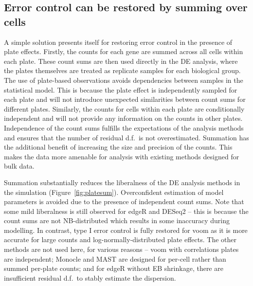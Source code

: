 \documentclass[oupdraft]{bio}
\begin{document}
\subsection{Error control can be restored by summing over cells}
A simple solution presents itself for restoring error control in the presence of plate effects.
Firstly, the counts for each gene are summed across all cells within each plate.
These count sums are then used directly in the DE analysis, where the plates themselves are treated as replicate samples for each biological group.
The use of plate-based observations avoids dependencies between samples in the statistical model.
This is because the plate effect is independently sampled for each plate and will not introduce unexpected similarities between count sums for different plates.
Similarly, the counts for cells within each plate are conditionally independent and will not provide any information on the counts in other plates.
Independence of the count sums fulfills the expectations of the analysis methods and ensures that the number of residual d.f.\ is not overestimated.
Summation has the additional benefit of increasing the size and precision of the counts.
This makes the data more amenable for analysis with existing methods designed for bulk data.


Summation substantially reduces the liberalness of the DE analysis methods in the simulation (Figure~\ref{fig:platesum}).
Overconfident estimation of model parameters is avoided due to the presence of independent count sums.
Note that some mild liberalness is still observed for edgeR and DESeq2 
    -- this is because the count sums are not NB-distributed which results in some inaccuracy during modelling.
In contrast, type I error control is fully restored for voom as it is more accurate for large counts and log-normally-distributed plate effects.
The other methods are not used here, for various reasons -- voom with correlations  plates are independent;
    Monocle and MAST are designed for per-cell rather than summed per-plate counts;
    and for edgeR without EB shrinkage, there are insufficient residual d.f.\ to stably estimate the dispersion.
\end{document}
